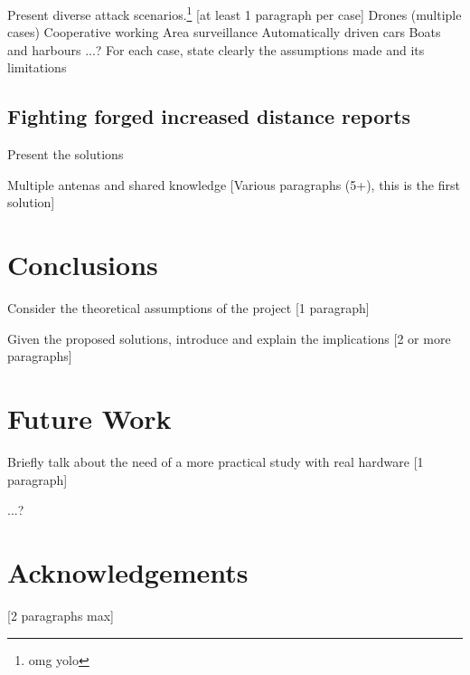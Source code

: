 \documentclass{article}
\begin{document}
Present diverse attack scenarios.\footnote{omg yolo} [at least 1 paragraph per case]
   Drones (multiple cases)
     Cooperative working
     Area surveillance
   Automatically driven cars
   Boats and harbours
  ...?
For each case, state clearly the assumptions made and its limitations


\subsection{Fighting forged increased distance reports}

Present the solutions

Multiple antenas and shared knowledge [Various paragraphs (5+), this is the first solution]










\section{Conclusions}
\label{sec:conclusions}

Consider the theoretical assumptions of the project [1 paragraph]

Given the proposed solutions, introduce and explain the implications [2 or more paragraphs]










\section{Future Work}
\label{sec:futurework}

Briefly talk about the need of a more practical study with real hardware [1 paragraph]

...?











\section{Acknowledgements}
\label{sec:acknowledgements}

[2 paragraphs max]

\printbibliography


\end{document}
